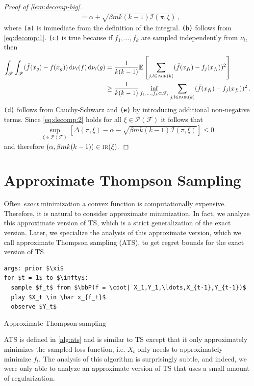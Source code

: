 \documentclass[letter, 12pt]{report}
\newcommand{\pair}{\operatorname{\textsc{pair}}}
\newcommand{\E}{\mathbb E}
\newcommand{\sF}{\mathscr F}
\newcommand{\sP}{\mathscr P}
\newcommand{\bbP}{\mathbb P}
\renewcommand{\d}[1]{\operatorname{d}\!#1}
\newcommand{\I}{\mathcal{I}}
\newcommand{\1}{\mathbf{1}}
\newcommand{\IR}{\operatorname{\textsc{ir}}}
\newcommand{\ts}{\textsc{TS}\xspace}
\newcommand{\ats}{\textsc{ATS}}
\theoremstyle{plain}
\theoremstyle{definition}
\theoremstyle{remark}
\begin{document}
\begin{proof}[Proof of \cref{lem:decomp-big}]
\begin{align}
         & = \alpha + \sqrt{\beta m k(k-1) \I(\pi, \xi)} \,, \label{eq:decomp:2}
    \end{align}
    where \texttt{(a)} is immediate from the definition of the integral.
    \texttt{(b)} follows from \cref{eq:decomp:1}.
    \texttt{(c)} is true because if $f_1,\ldots,f_k$ are sampled independently from $\nu_i$, then
    \begin{align*}
        \int_\sF \int_\sF (\bar f(x_g) - f(x_g)) \d{\nu_i}(f) \d{\nu_i}(g)
         & = \frac{1}{k(k-1)} \E\left[\sum_{j,l \in \pair(k)} (\bar f(x_{f_l}) - f_j(x_{f_l}))^2 \right]                            \\
         & \geq \frac{1}{k(k-1)} \inf_{f_1,\ldots,f_k \subset \sF_i} \sum_{j,l \in \pair(k)} (\bar f(x_{f_l}) - f_j(x_{f_l}))^2 \,.
    \end{align*}
    \texttt{(d)} follows from Cauchy-Schwarz and \texttt{(e)} by introducing additional non-negative terms.
    Since \cref{eq:decomp:2} holds for all $\xi \in \sP(\sF)$ it follows that
    \begin{align*}
        \sup_{\xi \in \sP(\sF)} \left[\Delta(\pi, \xi) - \alpha - \sqrt{\beta mk(k-1) \I(\pi, \xi)}\right] \leq 0
    \end{align*}
    and therefore $(\alpha, \beta mk(k-1)) \in \IR(\xi)$.
\end{proof}

\chapter{Approximate Thompson Sampling}\label{ch:ats}
Often \textit{exact} minimization a convex function is computationally expensive.
Therefore, it is natural to consider approximate minimization.
In fact, we analyze this approximate version of \ts,
which is a strict generalization of the exact version.
Later, we specialize the analysis of this approximate version,
which we call approximate Thompson sampling (\ats{}),
to get regret bounds for the exact version of \ts.
\begin{algorithm}[h!]
    \begin{minipage}{12cm}
        \begin{mdframed}
            \begin{lstlisting}
args: prior $\xi$
for $t = 1$ to $\infty$:
  sample $f_t$ from $\bbP(f = \cdot| X_1,Y_1,\ldots,X_{t-1},Y_{t-1})$
  play $X_t \in \bar x_{f_t}$
  observe $Y_t$
\end{lstlisting}
            \caption{Approximate Thompson sampling}\label{alg:ats}
        \end{mdframed}
    \end{minipage}
\end{algorithm}
\ats{} is defined in \cref{alg:ats} and is similar to \ts except that it only approximately minimizes the sampled loss function,
i.e. $X_t$ only needs to approximately minimize $f_t$.
The analysis of this algorithm is surprisingly subtle,
and indeed, we were only able to analyze an approximate version of \ts that uses a small amount of regularization.
\end{document}
